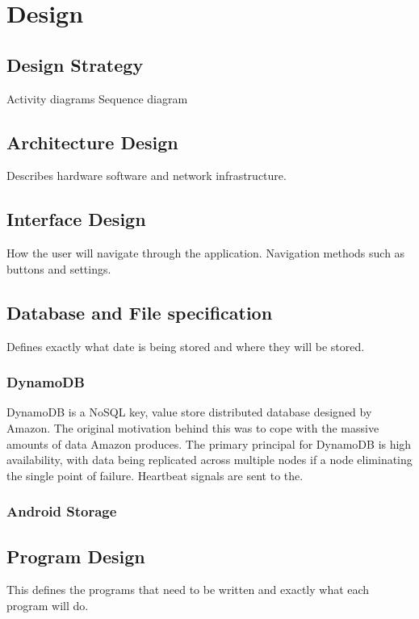 \documentclass[a4paper, 11pt]{article}
\begin{document}
\clearpage

\section{Design}

\subsection{Design Strategy}

Activity diagrams
Sequence diagram

\subsection{Architecture Design} Describes hardware software and network infrastructure. 
\subsection{Interface Design} How the user will navigate through the application. Navigation methods such as buttons and settings.

\subsection{Database and File specification} Defines exactly what date is being stored and where they will be stored.

\subsubsection{DynamoDB} 
DynamoDB is a NoSQL key, value store distributed database designed by Amazon. The original motivation behind this was to cope with the massive amounts of data Amazon produces. The primary principal for DynamoDB is high availability, with data being replicated across multiple nodes if a node eliminating the single point of failure. Heartbeat signals are sent to the. 
\subsubsection{Android Storage} 

\subsection{Program Design}This defines the programs that need to be written and exactly what each program will do. 
\end{document}
